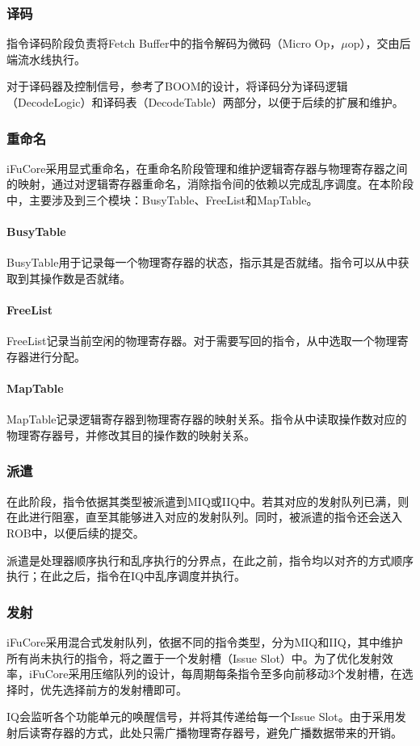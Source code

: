 \documentclass{article}
\begin{document}
\subsubsection{译码}
指令译码阶段负责将Fetch Buffer中的指令解码为微码（Micro Op，$\mu$op），交由后端流水线执行。\par
对于译码器及控制信号，参考了BOOM的设计，将译码分为译码逻辑（DecodeLogic）和译码表（DecodeTable）两部分，以便于后续的扩展和维护。\par

\subsubsection{重命名}
iFuCore采用显式重命名，在重命名阶段管理和维护逻辑寄存器与物理寄存器之间的映射，通过对逻辑寄存器重命名，消除指令间的依赖以完成乱序调度。在本阶段中，主要涉及到三个模块：BusyTable、FreeList和MapTable。\par

\paragraph{BusyTable}
BusyTable用于记录每一个物理寄存器的状态，指示其是否就绪。指令可以从中获取到其操作数是否就绪。

\paragraph{FreeList}
FreeList记录当前空闲的物理寄存器。对于需要写回的指令，从中选取一个物理寄存器进行分配。

\paragraph{MapTable}
MapTable记录逻辑寄存器到物理寄存器的映射关系。指令从中读取操作数对应的物理寄存器号，并修改其目的操作数的映射关系。

\subsubsection{派遣}
在此阶段，指令依据其类型被派遣到MIQ或IIQ中。若其对应的发射队列已满，则在此进行阻塞，直至其能够进入对应的发射队列。同时，被派遣的指令还会送入ROB中，以便后续的提交。\par
派遣是处理器顺序执行和乱序执行的分界点，在此之前，指令均以对齐的方式顺序执行；在此之后，指令在IQ中乱序调度并执行。\par

\subsubsection{发射}
iFuCore采用混合式发射队列，依据不同的指令类型，分为MIQ和IIQ，其中维护所有尚未执行的指令，将之置于一个发射槽（Issue Slot）中。为了优化发射效率，iFuCore采用压缩队列的设计，每周期每条指令至多向前移动3个发射槽，在选择时，优先选择前方的发射槽即可。\par
IQ会监听各个功能单元的唤醒信号，并将其传递给每一个Issue Slot。由于采用发射后读寄存器的方式，此处只需广播物理寄存器号，避免广播数据带来的开销。\par
\end{document}
